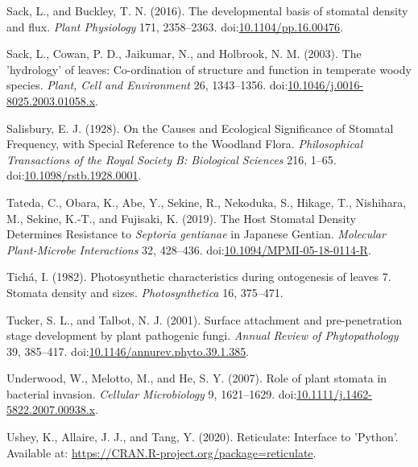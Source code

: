 \documentclass[utf8]{frontiersSCNS}
\begin{document}
\leavevmode\hypertarget{ref-sack_developmental_2016}{}%
Sack, L., and Buckley, T. N. (2016). The developmental basis of stomatal
density and flux. \emph{Plant Physiology} 171, 2358--2363.
doi:\href{https://doi.org/10.1104/pp.16.00476}{10.1104/pp.16.00476}.

\leavevmode\hypertarget{ref-sack_hydrology_2003}{}%
Sack, L., Cowan, P. D., Jaikumar, N., and Holbrook, N. M. (2003). The
'hydrology' of leaves: Co-ordination of structure and function in
temperate woody species. \emph{Plant, Cell and Environment} 26,
1343--1356.
doi:\href{https://doi.org/10.1046/j.0016-8025.2003.01058.x}{10.1046/j.0016-8025.2003.01058.x}.

\leavevmode\hypertarget{ref-salisbury_causes_1928}{}%
Salisbury, E. J. (1928). On the Causes and Ecological Significance of
Stomatal Frequency, with Special Reference to the Woodland Flora.
\emph{Philosophical Transactions of the Royal Society B: Biological
Sciences} 216, 1--65.
doi:\href{https://doi.org/10.1098/rstb.1928.0001}{10.1098/rstb.1928.0001}.

\leavevmode\hypertarget{ref-tateda_host_2019}{}%
Tateda, C., Obara, K., Abe, Y., Sekine, R., Nekoduka, S., Hikage, T.,
Nishihara, M., Sekine, K.-T., and Fujisaki, K. (2019). The Host Stomatal
Density Determines Resistance to \emph{Septoria gentianae} in Japanese
Gentian. \emph{Molecular Plant-Microbe Interactions} 32, 428--436.
doi:\href{https://doi.org/10.1094/MPMI-05-18-0114-R}{10.1094/MPMI-05-18-0114-R}.

\leavevmode\hypertarget{ref-ticha_photosynthetic_1982}{}%
Tichá, I. (1982). Photosynthetic characteristics during ontogenesis of
leaves 7. Stomata density and sizes. \emph{Photosynthetica} 16,
375--471.

\leavevmode\hypertarget{ref-tucker_surface_2001}{}%
Tucker, S. L., and Talbot, N. J. (2001). Surface attachment and
pre-penetration stage development by plant pathogenic fungi.
\emph{Annual Review of Phytopathology} 39, 385--417.
doi:\href{https://doi.org/10.1146/annurev.phyto.39.1.385}{10.1146/annurev.phyto.39.1.385}.

\leavevmode\hypertarget{ref-underwood_role_2007}{}%
Underwood, W., Melotto, M., and He, S. Y. (2007). Role of plant stomata
in bacterial invasion. \emph{Cellular Microbiology} 9, 1621--1629.
doi:\href{https://doi.org/10.1111/j.1462-5822.2007.00938.x}{10.1111/j.1462-5822.2007.00938.x}.

\leavevmode\hypertarget{ref-ushey_reticulate_2020}{}%
Ushey, K., Allaire, J. J., and Tang, Y. (2020). Reticulate: Interface to
'Python'. Available at:
\url{https://CRAN.R-project.org/package=reticulate}.
\end{document}
